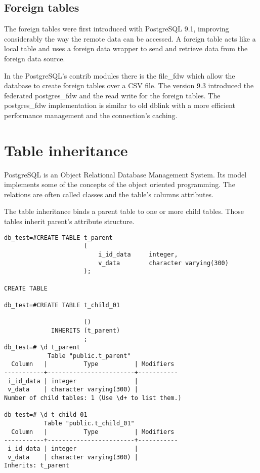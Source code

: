 \subsection{Foreign tables}
The foreign tables were first introduced with PostgreSQL 9.1, improving considerably the way the
remote data can be accessed. A foreign table acts like a local table and uses a foreign data
wrapper to send and retrieve data from the foreign data source.\newline

In the PostgreSQL's contrib modules there is the file\_fdw which allow the database to create
foreign tables over a CSV file. The version 9.3 introduced the federated postgres\_fdw and the read
write for the foreign tables. The postgres\_fdw implementation is similar to old dblink with a more
efficient performance management and the connection's caching.

\section{Table inheritance}
PostgreSQL is an Object Relational Database Management System. Its model implements some of the
concepts of the object oriented programming. The relations are often called classes and the table's 
columns attributes. \newline

The table inheritance binds a parent table to one or more child tables. Those tables inherit
parent's attribute structure. 

\begin{lstlisting}[style=pgsql]
db_test=#CREATE TABLE t_parent
                      (
                          i_id_data     integer,
                          v_data        character varying(300)
                      );

CREATE TABLE                     

db_test=#CREATE TABLE t_child_01
                      
                      ()
             INHERITS (t_parent)
                      ;                      
db_test=# \d t_parent
            Table "public.t_parent"
  Column   |          Type          | Modifiers 
-----------+------------------------+-----------
 i_id_data | integer                | 
 v_data    | character varying(300) | 
Number of child tables: 1 (Use \d+ to list them.)

db_test=# \d t_child_01 
           Table "public.t_child_01"
  Column   |          Type          | Modifiers 
-----------+------------------------+-----------
 i_id_data | integer                | 
 v_data    | character varying(300) | 
Inherits: t_parent

\end{lstlisting}

